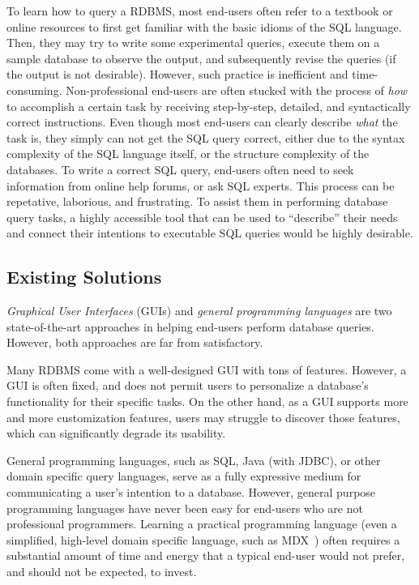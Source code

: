 To learn how to query a RDBMS, most end-users often refer
to a textbook or online resources to first get familiar with
the basic idioms of the SQL language. Then, they may
try to write some experimental queries, execute them
on a sample database to observe the output, and
subsequently revise the queries (if the output is not desirable).
However, such practice is inefficient and time-consuming.
Non-professional end-users are often stucked with the
process of \textit{how} to
accomplish a certain task by receiving step-by-step, detailed,
and syntactically correct instructions.
Even though most end-users can clearly
describe \textit{what} the task is, they
simply can not get the SQL query correct,
either due to the syntax complexity of the SQL language itself,
or the structure complexity of the databases.
To write a correct SQL query, end-users often need to
seek information from online help forums, or ask
SQL experts. This process can be repetative, laborious, and frustrating.
To assist them in performing database query tasks,
a highly accessible tool that can be used to ``describe''
their needs and connect their intentions to executable
SQL queries would be highly desirable.


\subsection{Existing Solutions}


\textit{Graphical User Interfaces} (GUIs) and \textit{general programming languages}
are two state-of-the-art approaches in helping end-users perform
database queries. However, both approaches are far from satisfactory.

Many RDBMS come with a well-designed GUI with tons of features.
However, 
a GUI is often fixed, and does not permit users to personalize
a database's functionality for their specific tasks. On the other hand,
as a GUI supports more and more customization features, users
may struggle to discover those features, which can significantly
degrade its usability. 

General programming languages, such as SQL,
Java (with JDBC), or other domain specific query languages, 
serve as a fully expressive medium  for
communicating a user's intention to a database. However, 
general purpose programming languages have never been easy for
end-users who are not professional programmers.  Learning
a practical programming language (even a simplified, high-level domain
specific language, such as MDX~\cite{mdx}) often requires a substantial amount
of time and energy that a typical end-user would not prefer,
and should not be expected, to invest. 



